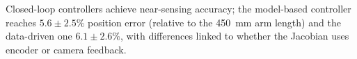 Closed-loop controllers achieve near-sensing accuracy; the model-based controller reaches $5.6 \pm 2.5\%$ position error (relative to the 450~mm arm length) and the data-driven one $6.1 \pm 2.6\%$, with differences linked to whether the Jacobian uses encoder or camera feedback.
